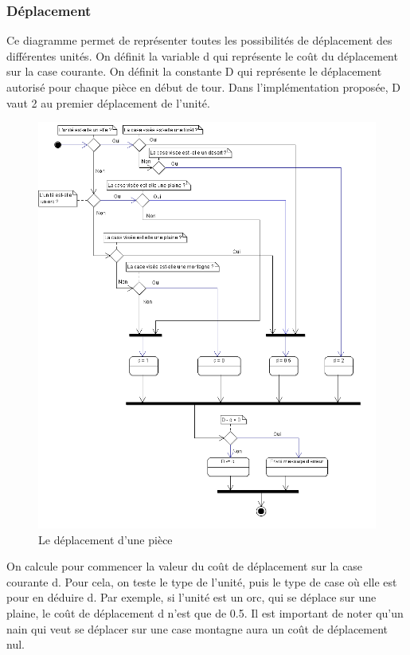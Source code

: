 \subsubsection{Déplacement}
Ce diagramme permet de représenter toutes les possibilités de déplacement des différentes unités. On définit la variable d qui représente le coût du déplacement sur la case courante. On définit la constante D qui représente le déplacement autorisé pour chaque pièce en début de tour. Dans l'implémentation proposée, D vaut 2 au premier déplacement de l'unité.

\begin{figure}[!h]
\centering
\includegraphics[width=1\textwidth]{img/Deplacement.png}
\caption{Le déplacement d'une pièce}
\end{figure}

On calcule pour commencer la valeur du coût de déplacement sur la case courante d. Pour cela, on teste le type de l'unité, puis le type de case où elle est pour en déduire d. Par exemple, si l'unité est un orc, qui se déplace sur une plaine, le coût de déplacement d n'est que de 0.5. Il est important de noter qu'un nain qui veut se déplacer sur une case montagne aura un coût de déplacement nul.

